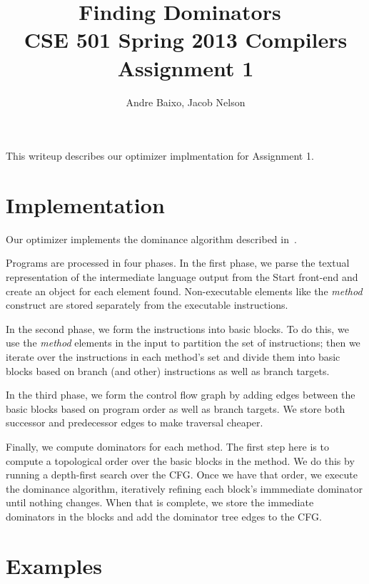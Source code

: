 \documentclass[10pt,twocolumn]{article}
\begin{document}
\title{Finding Dominators\ \\
  \small CSE 501 Spring 2013 Compilers Assignment 1}
\author{Andre Baixo, Jacob Nelson}
\maketitle

This writeup describes our optimizer implmentation for Assignment 1.

\section{Implementation}

Our optimizer implements the dominance algorithm described in~\cite{Cooper_asimple}. 

Programs are processed in four phases. In the first phase, we parse
the textual representation of the intermediate language output from
the Start front-end and create an object for each element
found. Non-executable elements like the {\it method} construct are
stored separately from the executable instructions.

In the second phase, we form the instructions into basic blocks. To do
this, we use the {\it method} elements in the input to partition the
set of instructions; then we iterate over the instructions in each
method's set and divide them into basic blocks based on branch (and
other) instructions as well as branch targets.

In the third phase, we form the control flow graph by adding edges
between the basic blocks based on program order as well as branch
targets. We store both successor and predecessor edges to make
traversal cheaper.

Finally, we compute dominators for each method. The first step here is
to compute a topological order over the basic blocks in the method. We
do this by running a depth-first search over the CFG. Once we have
that order, we execute the dominance algorithm, iteratively refining
each block's immmediate dominator until nothing changes. When that is
complete, we store the immediate dominators in the blocks and add the
dominator tree edges to the CFG.


\section{Examples}
\end{document}
